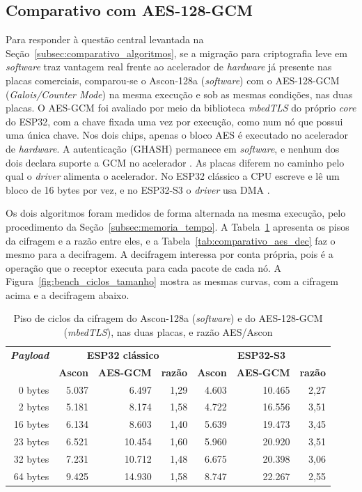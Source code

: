 
\subsection{Comparativo com AES-128-GCM}
\label{subsec:comparativo_aes}

Para responder à questão central levantada na Seção~\ref{subsec:comparativo_algoritmos}, se a migração para criptografia leve em \textit{software} traz vantagem real frente ao acelerador de \textit{hardware} já presente nas placas comerciais, comparou-se o Ascon-128a (\textit{software}) com o AES-128-GCM (\textit{Galois/Counter Mode}) na mesma execução e sob as mesmas condições, nas duas placas. O AES-GCM foi avaliado por meio da biblioteca \textit{mbedTLS} do próprio \textit{core} do ESP32, com a chave fixada uma vez por execução, como num nó que possui uma única chave. Nos dois chips, apenas o bloco AES é executado no acelerador de \textit{hardware}. A autenticação (GHASH) permanece em \textit{software}, e nenhum dos dois declara suporte a GCM no acelerador \cite{espressif2026idf}. As placas diferem no caminho pelo qual o \textit{driver} alimenta o acelerador. No ESP32 clássico a CPU escreve e lê um bloco de 16 bytes por vez, e no ESP32-S3 o \textit{driver} usa DMA \cite{espressif2026idf}.

Os dois algoritmos foram medidos de forma alternada na mesma execução, pelo procedimento da Seção~\ref{subsec:memoria_tempo}. A Tabela~\ref{tab:comparativo_aes} apresenta os pisos da cifragem e a razão entre eles, e a Tabela~\ref{tab:comparativo_aes_dec} faz o mesmo para a decifragem. A decifragem interessa por conta própria, pois é a operação que o receptor executa para cada pacote de cada nó. A Figura~\ref{fig:bench_ciclos_tamanho} mostra as mesmas curvas, com a cifragem acima e a decifragem abaixo.

\begin{table}[htb]
\centering
\caption{Piso de ciclos da cifragem do Ascon-128a (\textit{software}) e do AES-128-GCM (\textit{mbedTLS}), nas duas placas, e razão AES/Ascon}
\label{tab:comparativo_aes}
\begin{tabular}{rrrrrrr}
\hline
\textbf{\textit{Payload}} & \multicolumn{3}{c}{\textbf{ESP32 clássico}} & \multicolumn{3}{c}{\textbf{ESP32-S3}} \\
 & \textbf{Ascon} & \textbf{AES-GCM} & \textbf{razão} & \textbf{Ascon} & \textbf{AES-GCM} & \textbf{razão} \\
\hline
0 bytes  & 5.037 & 6.497  & 1,29 & 4.603 & 10.465 & 2,27 \\
2 bytes  & 5.181 & 8.174  & 1,58 & 4.722 & 16.556 & 3,51 \\
16 bytes & 6.134 & 8.603  & 1,40 & 5.639 & 19.473 & 3,45 \\
23 bytes & 6.521 & 10.454 & 1,60 & 5.960 & 20.920 & 3,51 \\
32 bytes & 7.231 & 10.712 & 1,48 & 6.675 & 20.398 & 3,06 \\
64 bytes & 9.425 & 14.930 & 1,58 & 8.747 & 22.267 & 2,55 \\
\hline
\end{tabular}
\end{table}

